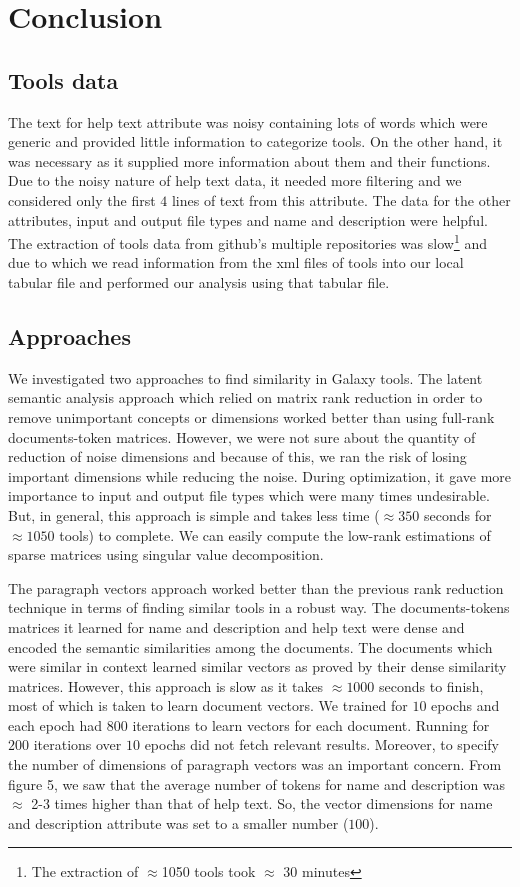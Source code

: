 \chapter{Conclusion}
\section{Tools data}
The text for help text attribute was noisy containing lots of words which were generic and provided little information to categorize tools. On the other hand, it was necessary as it supplied more information about them and their functions. Due to the noisy nature of help text data, it needed more filtering and we considered only the first $4$ lines of text from this attribute. The data for the other attributes, input and output file types and name and description were helpful. The extraction of tools data from github's multiple repositories was slow\footnote{The extraction of $\approx$1050 tools took $\approx$ 30 minutes} and due to which we read information from the xml files of tools into our local tabular file and performed our analysis using that tabular file.

\section{Approaches}
We investigated two approaches to find similarity in Galaxy tools. The latent semantic analysis approach which relied on matrix rank reduction in order to remove unimportant concepts or dimensions worked better than using full-rank documents-token matrices. However, we were not sure about the quantity of reduction of noise dimensions and because of this, we ran the risk of losing important dimensions while reducing the noise. During optimization, it gave more importance to input and output file types which were many times undesirable. But, in general, this approach is simple and takes less time ($\approx350$ seconds for $\approx1050$ tools) to complete. We can easily compute the low-rank estimations of sparse matrices using singular value decomposition. 

The paragraph vectors approach worked better than the previous rank reduction technique in terms of finding similar tools in a robust way. The documents-tokens matrices it learned for name and description and help text were dense and encoded the semantic similarities among the documents. The documents which were similar in context learned similar vectors as proved by their dense similarity matrices. However, this approach is slow as it takes $\approx1000$ seconds to finish, most of which is taken to learn document vectors. We trained for $10$ epochs and each epoch had $800$ iterations to learn vectors for each document. Running for $200$ iterations over $10$ epochs did not fetch relevant results. Moreover, to specify the number of dimensions of paragraph vectors was an important concern. From figure 5, we saw that the average number of tokens for name and description was $\approx$ 2-3 times higher than that of help text. So, the vector dimensions for name and description attribute was set to a smaller number ($100$). 

